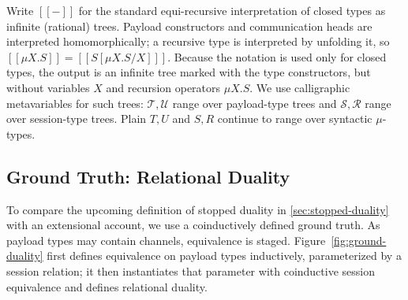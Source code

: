 \documentclass[submission,copyright,creativecommons]{eptcs}
\newcommand{\sem}[1]{[\![#1]\!]}
\begin{document}
Write $\sem{-}$ for the standard equi-recursive interpretation of closed types
as infinite (rational) trees.  Payload constructors and communication heads are
interpreted homomorphically; a recursive type is interpreted by unfolding it, so
$\sem{\mu X.S} = \sem{S[\mu X.S/X]}$.  Because the notation is used only for
closed types, the output is an infinite tree marked with the type constructors,
but without variables $X$ and recursion operators $\mu X.S$.  We use
calligraphic metavariables for such trees: $\mathcal T,\mathcal U$ range over
payload-type trees and $\mathcal S,\mathcal R$ range over session-type trees.
Plain $T,U$ and $S,R$ continue to range over syntactic $\mu$-types.

\subsection{Ground Truth: Relational Duality}
\label{sec:ground-truth}

To compare the upcoming definition of stopped duality in
\cref{sec:stopped-duality} with an extensional account, we use a coinductively
defined ground truth.  As payload types may contain channels, equivalence is staged.
Figure~\ref{fig:ground-duality} first defines equivalence on payload types
inductively, parameterized by a session relation; it then instantiates that
parameter with coinductive session equivalence and defines relational duality.
\end{document}
